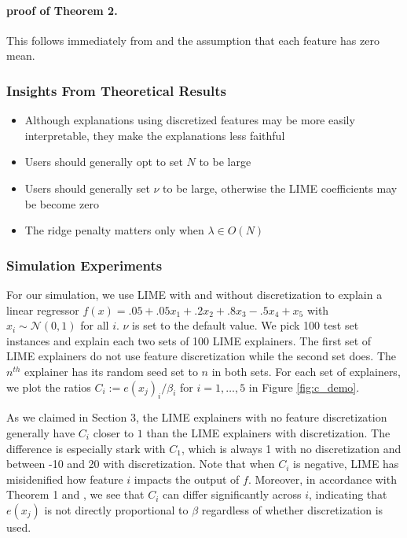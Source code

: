 \documentclass[mnsc,blindrev]{informs3}
\begin{document}
            
        \paragraph{proof of Theorem 2.}
            This follows immediately from \citep{StrumbeljErik2014Epma} and the assumption that each feature has zero mean.
    
        \subsubsection{Insights From Theoretical Results}
            \begin{itemize}
                \item Although explanations using discretized features may be more easily interpretable, they make the explanations less faithful
                \item Users should generally opt to set $N$ to be large 
                \item Users should generally set $\nu$ to be large, otherwise the LIME coefficients may be become zero
                \item The ridge penalty matters only when $\lambda \in O(N)$
            \end{itemize}
    
            \subsubsection{Simulation Experiments}
                \label{sec:simulation_experiments}
                For our simulation, we use LIME with and without discretization to explain a linear regressor $f(x) = .05 + .05x_1+ .2x_2+ .8x_3 -.5x_4 +x_5$ with $x_i \sim \mathcal{N}(0,1)$ for all $i$. $\nu$ is set to the default value. We pick 100 test set instances and explain each two sets of 100 LIME explainers. The first set of LIME explainers do not use feature discretization while the second set does. The $n^{th}$ explainer has its random seed set to $n$ in both sets. For each set of explainers, we plot the ratios $C_i:= e(x_j)_i/\beta_i$ for $i=1,\ldots,5$ in Figure \ref{fig:c_demo}.
    
                As we claimed in Section 3, the LIME explainers with no feature discretization generally have $C_i$ closer to $1$ than the LIME explainers with discretization. The difference is especially stark with $C_{1}$, which is always 1 with no discretization and between -10 and 20 with discretization. Note that when $C_i$ is negative, LIME has misidenified how feature $i$ impacts the output of $f$. Moreover, in accordance with Theorem 1 and \citep{garreau20theoretical}, we see that $C_i$ can differ significantly across $i$, indicating that $e(x_j)$ is not directly proportional to $\beta$ regardless of whether discretization is used. 
    
\end{document}
